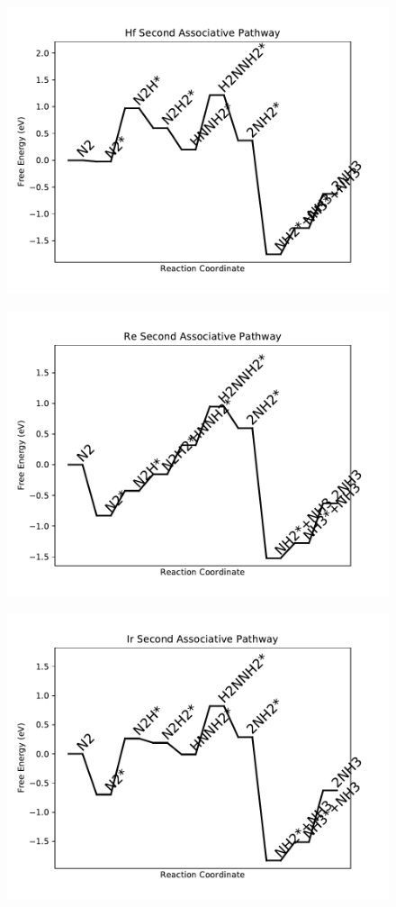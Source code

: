 \begin{figure}
\includegraphics[width=0.8\linewidth]{data/plots/Hf_associative_2.pdf}
\label{fig:Hf_associative_2}
\end{figure}

\begin{figure}
\includegraphics[width=0.8\linewidth]{data/plots/Re_associative_2.pdf}
\label{fig:Re_associative_2}
\end{figure}

\begin{figure}
\includegraphics[width=0.8\linewidth]{data/plots/Ir_associative_2.pdf}
\label{fig:Ir_associative_2}
\end{figure}

